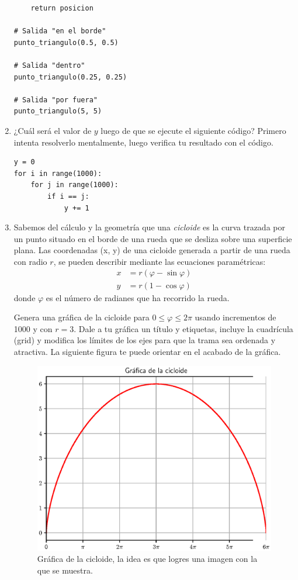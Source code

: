 \begin{enumerate}
\begin{verbatim}
    return posicion

# Salida "en el borde"
punto_triangulo(0.5, 0.5)

# Salida "dentro"
punto_triangulo(0.25, 0.25)

# Salida "por fuera"
punto_triangulo(5, 5)
\end{verbatim}
\item ¿Cuál será el valor de $y$ luego de que se ejecute el siguiente código? Primero intenta  resolverlo mentalmente, luego verifica tu resultado con el código.
\begin{verbatim}
y = 0
for i in range(1000):
    for j in range(1000):
        if i == j:
            y += 1
\end{verbatim}
\item Sabemos del cálculo y la geometría que una \textit{cicloide} es la curva trazada por un punto situado en el borde de una rueda que se desliza sobre una superficie plana. Las coordenadas (x, y) de una cicloide generada a partir de una rueda con radio $r$, se pueden describir mediante las ecuaciones paramétricas:
\begin{align*}
x &= r (\varphi - \sin \varphi) \\[0.5em]
y &= r (1 - \cos \varphi)
\end{align*}
donde $\varphi$ es el número de radianes que ha recorrido la rueda.
\par
Genera una gráfica de la cicloide para $0 \leq \varphi \leq 2\pi$ usando incrementos de 1000 y con $r = 3$. Dale a tu gráfica un título y etiquetas, incluye la cuadrícula (grid) y modifica los límites de los ejes para que la trama sea ordenada y atractiva. La siguiente figura te puede orientar en el acabado de la gráfica.
\begin{figure}[H]
    \centering
    \includegraphics[scale=0.9]{Imagenes/Grafica_Cicloide.eps}
    \caption{Gráfica de la cicloide, la idea es que logres una imagen con la que se muestra.}
\end{figure}
\end{enumerate}
